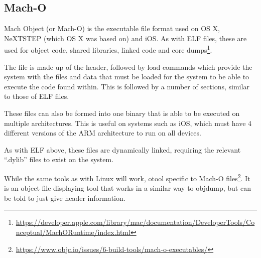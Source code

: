		\subsection{Mach-O}
			Mach Object (or Mach-O) is the executable file format used on OS X, NeXTSTEP (which OS X was based on) and iOS.
			As with ELF files, these are used for object code, shared libraries, linked code and core dumps\footnote{\url{https://developer.apple.com/library/mac/documentation/DeveloperTools/Conceptual/MachORuntime/index.html}}.

			The file is made up of the header, followed by load commands which provide the system with the files and data that must be loaded for the system to be able to execute the code found within.
			This is followed by a number of sections, similar to those of ELF files.

			These files can also be formed into one binary that is able to be executed on multiple architectures.
			This is useful on systems such as iOS, which must have 4 different versions of the ARM architecture to run on all devices.

			As with ELF above, these files are dynamically linked, requiring the relevant ``.dylib'' files to exist on the system.

			While the same tools as with Linux will work, otool specific to Mach-O files\footnote{\url{https://www.objc.io/issues/6-build-tools/mach-o-executables/}}.
			It is an object file displaying tool that works in a similar way to objdump, but can be told to just give header information.

